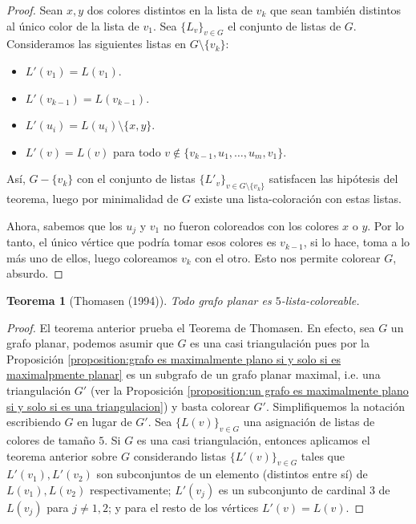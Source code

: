 \documentclass[12pt]{report}
\theoremstyle{plain}
\newtheorem{theorem}{Teorema}[section]
\theoremstyle{definition}
\begin{document}
\begin{proof}
Sean $x,y$ dos colores distintos en la lista de $v_k$ que sean también distintos al único color de la lista de $v_1$. Sea $\{L_v\}_{v \in G}$ el conjunto de listas de $G$. Consideramos las siguientes listas en $G\setminus \{v_k\}$:
\begin{itemize}
\item $L'(v_1) = L(v_1)$.
\item $L'(v_{k-1}) = L(v_{k-1})$.
\item $L'(u_i) = L(u_i) \setminus \{x,y\}$.
\item $L'(v) = L(v)$ para todo $v \not \in \{v_{k-1}, u_1, \ldots, u_m, v_1 \}$.
\end{itemize}
Así, $G- \{v_k\}$ con el conjunto de listas $\{L'_v\}_{v \in G \setminus \{v_k\}}$ satisfacen las hipótesis del teorema, luego por minimalidad de $G$ existe una lista-coloración con estas listas.


Ahora, sabemos que los $u_j$ y $v_1$ no fueron coloreados con los colores $x$ o $y$. Por lo tanto, el único vértice que podría tomar esos colores es $v_{k-1}$, si lo hace, toma a lo más uno de ellos, luego coloreamos $v_k$ con el otro. Esto nos permite colorear $G$, absurdo.
\end{proof}


\begin{theorem}[Thomasen (1994)]\label{th:teorema de thomasen}
Todo grafo planar es $5$-lista-coloreable.
\end{theorem}
\begin{proof}
El teorema anterior prueba el Teorema de Thomasen. En efecto, sea $G$ un grafo planar, podemos asumir que $G$ es una casi triangulación pues por la Proposición \ref{proposition:grafo es maximalmente plano si y solo si es maximalpmente planar} es un subgrafo de un grafo planar maximal, i.e. una triangulación $G'$ (ver la Proposición \ref{proposition:un grafo es maximalmente plano si y solo si es una triangulacion}) y basta colorear $G'$. Simplifiquemos la notación escribiendo $G$ en lugar de $G'$. Sea $\{L(v)\}_{v \in G}$ una asignación de listas de colores de tamaño $5$. Si $G$ es una casi triangulación, entonces aplicamos el teorema anterior sobre $G$ considerando listas $\{ L'(v)\}_{v \in G}$ tales que $L'(v_1), L'(v_2)$ son subconjuntos de un elemento (distintos entre sí) de $L(v_1), L(v_2)$ respectivamente; $L'(v_j)$ es un subconjunto de cardinal $3$ de $L(v_j)$ para $j \neq 1,2$; y para el resto de los vértices $L'(v) = L(v)$.
\end{proof}
\end{document}
